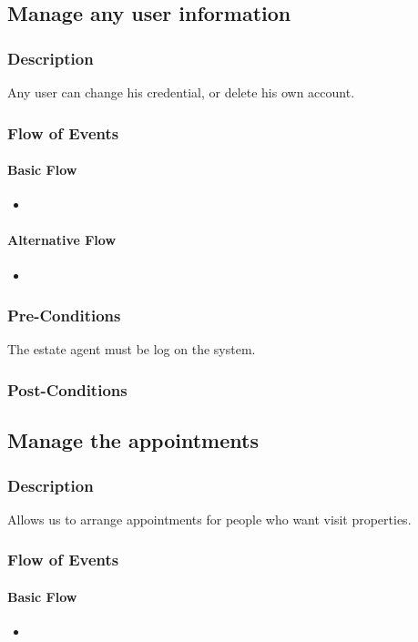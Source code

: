 \documentclass[a4paper,12pt]{article}
\begin{document}
\subsection{Manage any user information}
\subsubsection{Description}
Any user can change his credential, or delete his own account.
\subsubsection{Flow of Events}
\paragraph{Basic Flow}
\begin{itemize}
\item
\end{itemize}
\paragraph{Alternative Flow}
\begin{itemize}
\item
\end{itemize}
\subsubsection{Pre-Conditions}
The estate agent must be log on the system.
\subsubsection{Post-Conditions}

\subsection{Manage the appointments}
\subsubsection{Description}
Allows us to arrange appointments for people who want visit properties.
\subsubsection{Flow of Events}
\paragraph{Basic Flow}
\begin{itemize}
\item
\end{itemize}
\end{document}
